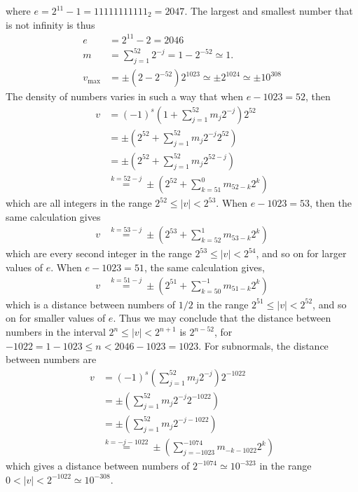where $e=2^{11}-1=11111111111_2=2047$. The largest and smallest number that is not infinity is thus
\begin{align}
  e &= 2^{11}-2 = 2046\\
  m &= \sum _{j=1}^{52}2^{-j} = 1 - 2^{-52} \simeq 1.\\
  v_\text{max} &= \pm \left(2-2^{-52}\right) 2^{1023} \simeq \pm 2^{1024} \simeq \pm 10^{308}
\end{align}
The density of numbers varies in such a way that when $e-1023 = 52$, then
\begin{align}
  v &= \left(-1\right)^{s} \left(1+\sum _{j=1}^{52}m_j2^{-j}\right) 2^{52} 
  \\&= \pm \left(2^{52}+\sum _{j=1}^{52}m_j2^{-j}2^{52}\right) 
  \\&= \pm \left(2^{52}+\sum _{j=1}^{52}m_j2^{52-j}\right) 
  \\&\overset{k=52-j}{=} \pm \left(2^{52}+\sum _{k=51}^{0}m_{52-k}2^k\right) 
\end{align}
which are all integers in the range $2^{52}\leq |v| < 2^{53}$. When $e-1023 = 53$, then the same calculation gives
\begin{align}
  v &\overset{k=53-j}{=} \pm \left(2^{53}+\sum _{k=52}^{1}m_{53-k}2^k\right) 
\end{align}
which are every second integer in the range $2^{53}\leq |v| < 2^{54}$, and so on for larger values of $e$. When $e-1023 = 51$, the same calculation gives,
\begin{align}
  v &\overset{k=51-j}{=} \pm \left(2^{51}+\sum _{k=50}^{-1}m_{51-k}2^k\right) 
\end{align}
which is a distance between numbers of $1/2$ in the range $2^{51}\leq |v| < 2^{52}$, and so on for smaller values of $e$. Thus we may conclude that the distance between numbers in the interval $2^n\leq |v| < 2^{n+1}$ is $2^{n-52}$, for $-1022 = 1-1023\leq n<2046-1023=1023$.  For subnormals, the distance between numbers are
\begin{align}
  v &= \left(-1\right)^{s} \left(\sum _{j=1}^{52}m_j2^{-j}\right) 2^{-1022} 
  \\&= \pm \left(\sum _{j=1}^{52}m_j2^{-j}2^{-1022}\right) 
  \\&= \pm \left(\sum _{j=1}^{52}m_j2^{-j -1022}\right) 
  \\&\overset{k=-j-1022}{=} \pm \left(\sum _{j=-1023}^{-1074}m_{-k-1022}2^k\right) 
\end{align}
which gives a distance between numbers of $2^{-1074} \simeq 10^{-323}$ in the range $0<|v|<2^{-1022}\simeq10^{-308}$.


